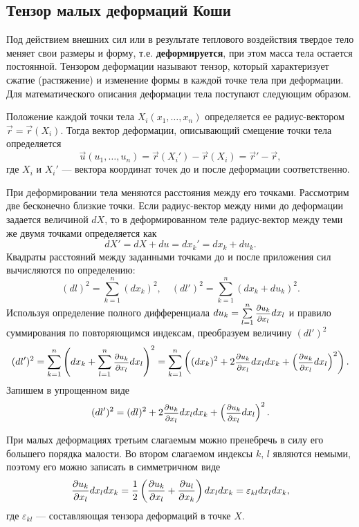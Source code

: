 \documentclass[12pt, a4paper]{article}
\begin{document}
	\subsection{Тензор малых деформаций Коши}
	Под действием внешних сил или в результате теплового воздействия твердое тело меняет свои размеры и форму, т.е. \textbf{деформируется}, при этом масса тела остается постоянной. Тензором деформации называют тензор, который характеризует сжатие (растяжение) и изменение формы в каждой точке тела при деформации.
	 Для математического описания деформации тела поступают следующим образом.
	
	Положение каждой точки тела $X_i(x_1,\dots,x_n)$ определяется ее радиус-вектором $\vec{r}=\vec{r}(X_i)$. Тогда вектор деформации, описывающий смещение точки тела определяется
	\begin{equation}
\vec u(u_1,\dots,u_n) = \vec r(X_i ')-\vec r(X_i)=\vec r'-\vec r,
	\end{equation}
	где $X_i$ и $X_i'$ --- вектора координат точек до и после деформации соответственно.
	
	
	При деформировании тела меняются расстояния между его точками. Рассмотрим две бесконечно близкие точки. Если радиус-вектор между ними до деформации задается величиной $dX$, то в деформированном теле радиус-вектор между теми же двумя точками определяется как
	\begin{equation}
dX'= dX+du = dx_k'=dx_k+du_k.
	\end{equation}
	Квадраты расстояний между заданными точками до и после приложения сил вычисляются по определению:
	\[
	(dl)^2=\sum_{k=1}^{n}(dx_k)^2,\quad
	(dl')^2=\sum_{k=1}^{n}(dx_k+du_k)^2.
	\]
	Используя определение полного дифференциала $du_k = \sum\limits_{l=1}^n\hbox{\footnotesize$\displaystyle\frac{\partial u_k}{\partial x_l}$}dx_l$ и правило суммирования по повторяющимся индексам, преобразуем величину $(dl')^2$ 
	\[
	(dl')^2=\sum_{k=1}^{n}\left(dx_k+\sum_{l=1}^n\hbox{\footnotesize$\displaystyle\frac{\partial u_k}{\partial x_l}$}dx_l\right)^2 =
	\sum_{k=1}^{n}\left((dx_k)^2+2\hbox{\footnotesize$\displaystyle\frac{\partial u_k}{\partial x_l}$}dx_l dx_k+\left(\hbox{\footnotesize$\displaystyle\frac{\partial u_k}{\partial x_l}$}dx_l\right)^2\right).
	\]
	Запишем в упрощенном виде
	\begin{equation}
(dl')^2 = (dl)^2+2\hbox{\footnotesize$\displaystyle\frac{\partial u_k}{\partial x_l}$}dx_l dx_k+\left(\hbox{\footnotesize$\displaystyle\frac{\partial u_k}{\partial x_l}$}dx_l\right)^2.
	\end{equation}

При малых деформациях третьим слагаемым можно пренебречь в силу его большего порядка малости. Во втором слагаемом индексы $k,\,l$ являются немыми, поэтому его можно записать в симметричном виде
	\begin{equation}
	\frac{\partial u_k}{\partial x_l}dx_ldx_k=\frac12\left(\frac{\partial u_k}{\partial x_l}+\frac{\partial u_l}{\partial x_k}\right)dx_ldx_k=\varepsilon_{kl}dx_ldx_k,
	\end{equation}
где $\varepsilon_{kl}$ --- составляющая тензора деформаций в точке $X$.
\end{document}
